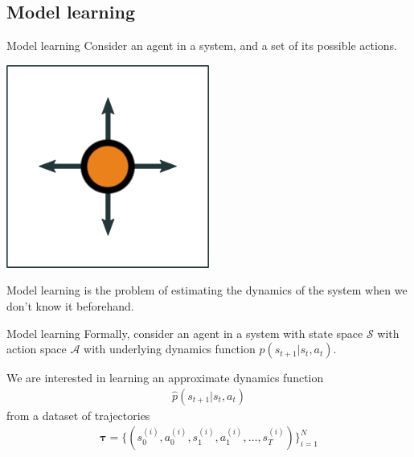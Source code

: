 \documentclass[10pt, compress]{beamer}
\begin{document}
\subsection{Model learning}

\begin{frame}{Model learning}
  Consider an agent in a system,
  and a set of its possible actions.
  \begin{center}
    \includegraphics[width=0.5\textwidth]{img/agent-env-1.png}
  \end{center}
  \pause
  Model learning is the problem of estimating the dynamics of the system
  when we don't know it beforehand.
\end{frame}

\begin{frame}{Model learning}
  Formally, consider an agent in a system with state space $\mathcal{S}$
  with action space $\mathcal{A}$ with underlying dynamics 
  function $p(s_{t + 1} | s_t, a_t)$.

  We are interested in learning an approximate dynamics function
  \begin{align*}\hat{p}(s_{t + 1} | s_t, a_t)\end{align*}
    from a dataset of trajectories \begin{align*}\bm{\tau} = \{(s^{(i)}_0, a^{(i)}_0, s^{(i)}_1, a^{(i)}_1, \ldots, s^{(i)}_T)\}_{i = 1}^N\end{align*}
\end{frame}
\end{document}
